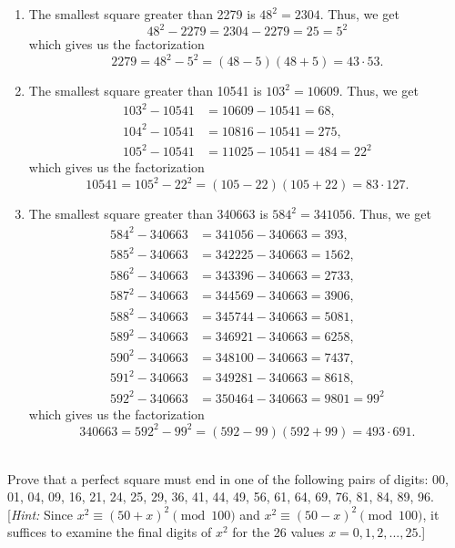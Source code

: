 \begin{solution}
    \begin{enumerate}
        \item The smallest square greater than 2279 is $48^2 = 2304$. Thus, we get 
        $$48^2 - 2279 = 2304 - 2279 = 25 = 5^2$$
        which gives us the factorization
        $$2279 = 48^2 - 5^2 = (48 - 5)(48 + 5) = 43 \cdot 53.$$
        \item The smallest square greater than 10541 is $103^2 = 10609$. Thus, we get
        \begin{align*}
            103^2 - 10541 &= 10609 - 10541 = 68, \\
            104^2 - 10541 &= 10816 - 10541 = 275, \\
            105^2 - 10541 &= 11025 - 10541 = 484 = 22^2
        \end{align*}
        which gives us the factorization
        $$10541 = 105^2 - 22^2 = (105 - 22)(105 + 22) = 83 \cdot 127.$$
        \item The smallest square greater than 340663 is $584^2 = 341056$. Thus, we get
        \begin{align*}
            584^2 - 340663 &= 341056 - 340663 = 393, \\
            585^2 - 340663 &= 342225 - 340663 = 1562, \\
            586^2 - 340663 &= 343396 - 340663 = 2733, \\
            587^2 - 340663 &= 344569 - 340663 = 3906, \\
            588^2 - 340663 &= 345744 - 340663 = 5081, \\
            589^2 - 340663 &= 346921 - 340663 = 6258, \\
            590^2 - 340663 &= 348100 - 340663 = 7437, \\
            591^2 - 340663 &= 349281 - 340663 = 8618, \\
            592^2 - 340663 &= 350464 - 340663 = 9801 = 99^2
        \end{align*}
        which gives us the factorization
        $$340663 = 592^2 - 99^2 = (592 - 99)(592 + 99) = 493 \cdot 691.$$ \\
    \end{enumerate}
\end{solution}

\begin{exercise}
    Prove that a perfect square must end in one of the following pairs of digits: 00, 01, 04, 09, 16, 21, 24, 25, 29, 36, 41, 44, 49, 56, 61, 64, 69, 76, 81, 84, 89, 96. [\textit{Hint:} Since $x^2 \equiv (50 + x)^2 \pmod{100}$ and $x^2 \equiv (50 - x)^2 \pmod{100}$, it suffices to examine the final digits of $x^2$ for the 26 values $x = 0,1,2,...,25$.] \\
\end{exercise}

